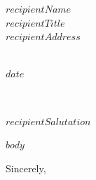 \documentclass[11pt,letterpaper]{letter} %
\def\opening#1{\thispagestyle{empty}
{\centering\fromaddress \vspace{1.5in} \\ %
\hspace{.0in}$date$\hspace*{\fill}\par} %
{\raggedright \toname \\ \toaddress \par} %
\vspace{0.4in} %
\noindent #1 %
}
\begin{document}

\begin{letter}
{$recipientName$\\
$recipientTitle$\\
$recipientAddress$\\
}


\opening{$recipientSalutation$}

$body$

\closing{Sincerely,}


\end{letter}
\end{document}

